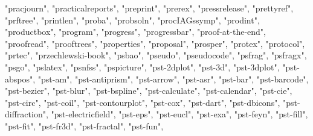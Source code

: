 \documentclass[
]{article}
\newenvironment{Shaded}{\begin{snugshade}}{\end{snugshade}}
\newcommand{\NormalTok}[1]{#1}
\newcommand{\StringTok}[1]{\textcolor[rgb]{0.31,0.60,0.02}{#1}}
\begin{document}
\begin{Shaded}
\begin{Highlighting}[]
\StringTok{"pracjourn"}\NormalTok{, }\StringTok{"practicalreports"}\NormalTok{, }\StringTok{"preprint"}\NormalTok{, }\StringTok{"prerex"}\NormalTok{, }\StringTok{"pressrelease"}\NormalTok{, }
\StringTok{"prettyref"}\NormalTok{, }\StringTok{"prftree"}\NormalTok{, }\StringTok{"printlen"}\NormalTok{, }\StringTok{"proba"}\NormalTok{, }\StringTok{"probsoln"}\NormalTok{, }\StringTok{"procIAGssymp"}\NormalTok{, }
\StringTok{"prodint"}\NormalTok{, }\StringTok{"productbox"}\NormalTok{, }\StringTok{"program"}\NormalTok{, }\StringTok{"progress"}\NormalTok{, }\StringTok{"progressbar"}\NormalTok{, }
\StringTok{"proof{-}at{-}the{-}end"}\NormalTok{, }\StringTok{"proofread"}\NormalTok{, }\StringTok{"prooftrees"}\NormalTok{, }\StringTok{"properties"}\NormalTok{, }
\StringTok{"proposal"}\NormalTok{, }\StringTok{"prosper"}\NormalTok{, }\StringTok{"protex"}\NormalTok{, }\StringTok{"protocol"}\NormalTok{, }\StringTok{"prtec"}\NormalTok{, }\StringTok{"przechlewski{-}book"}\NormalTok{, }
\StringTok{"psbao"}\NormalTok{, }\StringTok{"pseudo"}\NormalTok{, }\StringTok{"pseudocode"}\NormalTok{, }\StringTok{"psfrag"}\NormalTok{, }\StringTok{"psfragx"}\NormalTok{, }\StringTok{"psgo"}\NormalTok{, }
\StringTok{"pslatex"}\NormalTok{, }\StringTok{"psnfss"}\NormalTok{, }\StringTok{"pspicture"}\NormalTok{, }\StringTok{"pst{-}2dplot"}\NormalTok{, }\StringTok{"pst{-}3d"}\NormalTok{, }\StringTok{"pst{-}3dplot"}\NormalTok{, }
\StringTok{"pst{-}abspos"}\NormalTok{, }\StringTok{"pst{-}am"}\NormalTok{, }\StringTok{"pst{-}antiprism"}\NormalTok{, }\StringTok{"pst{-}arrow"}\NormalTok{, }\StringTok{"pst{-}asr"}\NormalTok{, }
\StringTok{"pst{-}bar"}\NormalTok{, }\StringTok{"pst{-}barcode"}\NormalTok{, }\StringTok{"pst{-}bezier"}\NormalTok{, }\StringTok{"pst{-}blur"}\NormalTok{, }\StringTok{"pst{-}bspline"}\NormalTok{, }
\StringTok{"pst{-}calculate"}\NormalTok{, }\StringTok{"pst{-}calendar"}\NormalTok{, }\StringTok{"pst{-}cie"}\NormalTok{, }\StringTok{"pst{-}circ"}\NormalTok{, }\StringTok{"pst{-}coil"}\NormalTok{, }
\StringTok{"pst{-}contourplot"}\NormalTok{, }\StringTok{"pst{-}cox"}\NormalTok{, }\StringTok{"pst{-}dart"}\NormalTok{, }\StringTok{"pst{-}dbicons"}\NormalTok{, }\StringTok{"pst{-}diffraction"}\NormalTok{, }
\StringTok{"pst{-}electricfield"}\NormalTok{, }\StringTok{"pst{-}eps"}\NormalTok{, }\StringTok{"pst{-}eucl"}\NormalTok{, }\StringTok{"pst{-}exa"}\NormalTok{, }\StringTok{"pst{-}feyn"}\NormalTok{, }
\StringTok{"pst{-}fill"}\NormalTok{, }\StringTok{"pst{-}fit"}\NormalTok{, }\StringTok{"pst{-}fr3d"}\NormalTok{, }\StringTok{"pst{-}fractal"}\NormalTok{, }\StringTok{"pst{-}fun"}\NormalTok{, }

\end{Highlighting}
\end{Shaded}
\end{document}
